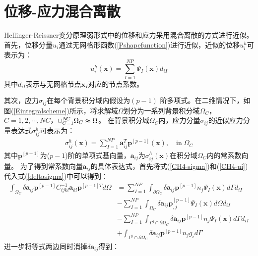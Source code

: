 \section{位移-应力混合离散}
Hellinger-Reissner变分原理弱形式中的位移和应力采用混合离散的方式进行近似。
首先，位移分量$u_i$通过无网格形函数(\ref{Pshapefunction})进行近似，近似的位移$u^h_i$可表示为：
\begin{equation}\label{CH4-ui}
    u^h_i(\pmb{x})=\sum_{I=1}^{N\!P}\Psi_I(\pmb{x})d_{iI}
\end{equation}
其中$d_{iI}$表示与无网格节点$\pmb{x}_I$对应的节点系数。\par
其次，应力$\sigma_{ij}$在每个背景积分域内假设为$(p-1)$ 阶多项式。在二维情况下，如图(\ref{Eintegralscheme})所示，将求解域$\Omega$划分为一系列背景积分域$\Omega_C$，$C=1,2,\dotsb,N\!C$，$\cup_{C=1}^{N\!C}\Omega_C\thickapprox\Omega$。
在背景积分域$\Omega_C$内，应力分量$\sigma_{ij}$的近似应力分量表达式$\sigma^h_{ij}$可表示为：
\begin{equation}\label{CH4-sigma}
\begin{split}
    \sigma^h_{ij}(\pmb{x})=\sum_{I=1}^{N\!P}\pmb{a}_{ij}^T\pmb{p}^{[p-1]}(\pmb{x}),\quad\text{in}\;\Omega_C
\end{split}
\end{equation}
其中$\pmb{p}^{[p-1]}$为($p-1$)阶的单项式基向量，$\pmb{a}_{ij}$为$\sigma_{ij}^h(\pmb{x})$在积分域$\Omega_C$内的常系数向量。
为了得到常系数向量$\pmb{a}_{ij}$的具体表达式，首先将式(\ref{CH4-sigma})和(\ref{CH4-ui})代入式(\ref{deltasigma})中可以得到：
\newpage
\begin{equation}
\begin{split}
    \int_{\Omega_C}\delta\pmb{a}_{ij}\pmb{p}^{[p-1]}C^{-1}_{ijkl}\pmb{a}_{kl}\pmb{p}^{[p-1]T}d\Omega&=\sum_{I=1}^{N\!P}\int_{\partial\Omega_C}\delta\pmb{a}_{ij}\pmb{p}^{[p-1]}n_j\Psi_I(\pmb{x})d\Gamma d_{iI}\\
    &-\sum_{I=1}^{N\!P}\int_{\Omega_C}\delta\pmb{a}_{ij}\pmb{p}_{,j}^{[p-1]}\Psi_{I}(\pmb{x})d\Omega d_{iI}\\
     &-\sum_{I=1}^{N\!P}\int_{\Gamma^g\cap\partial\Omega_C}\delta\pmb{a}_{ij}\pmb{p}^{[p-1]}n_j\Psi_I(\pmb{x})d\Gamma d_{iI}\\
     &+\int_{\Gamma^g\cap\partial\Omega_C}\delta\pmb{a}_{ij}\pmb{p}^{[p-1]}n_jg_id\Gamma
\end{split}
\end{equation}
进一步将等式两边同时消掉$\delta\pmb{a}_{ij}$得到：

